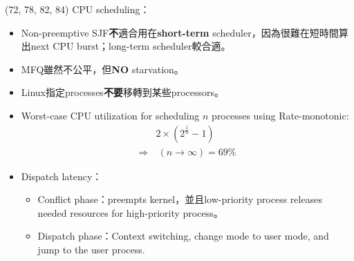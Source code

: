 \begin{theorem}{(72, 78, 82, 84)} CPU scheduling： \begin{itemize}
        \item Non-preemptive SJF\textbf{不}適合用在\textbf{short-term} scheduler，因為很難在短時間算出next CPU burst；long-term scheduler較合適。
        \item MFQ雖然不公平，但\textbf{NO} starvation。
        \item Linux指定processes\textbf{不要}移轉到某些processors。
        \item Worst-case CPU utilization for scheduling $n$ processes using Rate-monotonic: \begin{equation}
            \begin{aligned}
                & 2 \times (2^{\frac{1}{n}} - 1) \\
                \Rightarrow & \ (n \rightarrow \infty) = 69\%
            \end{aligned}
        \end{equation}
        \item Dispatch latency：\begin{itemize}
            \item Conflict phase：preempts kernel，並且low-priority process releases needed resources for high-priority process。
            \item Dispatch phase：Context switching, change mode to user mode, and jump to the user process.
        \end{itemize}
    \end{itemize}
\end{theorem}
